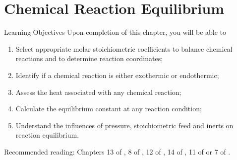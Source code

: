 \chapter{Chemical Reaction Equilibrium}\label{Chapter:ChemicalReactions}

   \begin{LearningObjectivesBlock}{Learning Objectives}
      Upon completion of this chapter, you will be able to
        \begin{enumerate}
           \item Select appropriate molar stoichiometric coefficients to balance chemical reactions and to determine reaction coordinates;
           \item Identify if a chemical reaction is either exothermic or endothermic;
           \item Assess the heat associated with any chemical reaction;
           \item Calculate the equilibrium constant at any reaction condition;
           \item Understand the influences of pressure, stoichiometric feed and inerts on reaction equilibrium.
        \end{enumerate}
\medskip
     Recommended reading: Chapters 13 of \citet{SmithVanNess_Book}, 8 of \cite{Sandler_Book}, 12 of \citet{Lue_Book}, 14 of \citet{Moran_Book}, 11 of \citet{Devoe_Book} or 7 of \citet{Atkins_Book}.
   \end{LearningObjectivesBlock}

\begin{comment}
   \begin{LearningObjectivesBlock}{Learning Objectives}
      Upon completion of this chapter, you will be able to
        \begin{enumerate}
           \item {\bf Knowledge:} Define, Name, Select, State 
           \item {\bf Comprehension:} Describe, Identify, Discuss
           \item {\bf Application:} Apply, Demonstrate, Employ, Sketch
           \item {\bf Analysis:} Analyse, Compare, Calculate, Solve
           \item {\bf Synthesis:} Determine, Formulate
           \item {\bf Evaluation:} Assess, Check, Estimate, Compare, Measure, Monitor
        \end{enumerate}
\end{comment}

